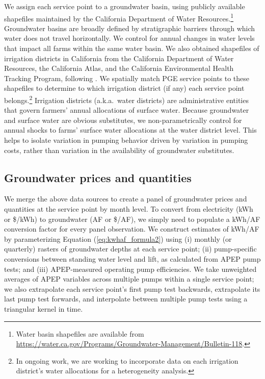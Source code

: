 We assign each service point to a groundwater basin, using publicly available shapefiles maintained by the California Department of Water Resources.\footnote{Water basin shapefiles are available from \url{https://water.ca.gov/Programs/Groundwater-Management/Bulletin-118}. 
}
 Groundwater basins are broadly defined by stratigraphic barriers through which water does not travel horizontally. We control for annual changes in water levels that impact all farms within the same water basin. We also obtained shapefiles of irrigation districts in California from the California Department of Water Resources, the California Atlas, and the California Environmental Health Tracking Program, following \textcite{hagerty2019}. We spatially match PGE service points to these shapefiles to determine to which irrigation district (if any) each service point belongs.\footnote{In ongoing work, we are working to incorporate data on each irrigation district's water allocations for a heterogeneity analysis.} Irrigation districts (a.k.a.\ water districts) are administrative entities that govern farmers' annual allocations of surface water. Because groundwater and surface water are obvious substitutes, we non-parametrically control for annual shocks to farms' surface water allocations at the water district level. This helps to isolate variation in pumping behavior driven by variation in pumping costs, rather than variation in the availability of groundwater substitutes.

\subsection{Groundwater prices and quantities}

We merge the above data sources to create a panel of groundwater prices and quantities at the service point by month level. To convert from electricity (kWh or \$/kWh) to groundwater (AF or \$/AF), we simply need to populate a kWh/AF conversion factor for every panel observation. We construct estimates of kWh/AF by parameterizing Equation (\ref{eq:kwhaf_formula2}) using (i) monthly (or quarterly) rasters of groundwater depths at each service point; (ii) pump-specific conversions between standing water level and lift, as calculated from APEP pump tests; and (iii) APEP-measured operating pump efficiencies. We take unweighted averages of APEP variables across multiple pumps within a single service point; we also extrapolate each service point's first pump test backwards, extrapolate its last pump test forwards, and interpolate between multiple pump tests using a triangular kernel in time. 


